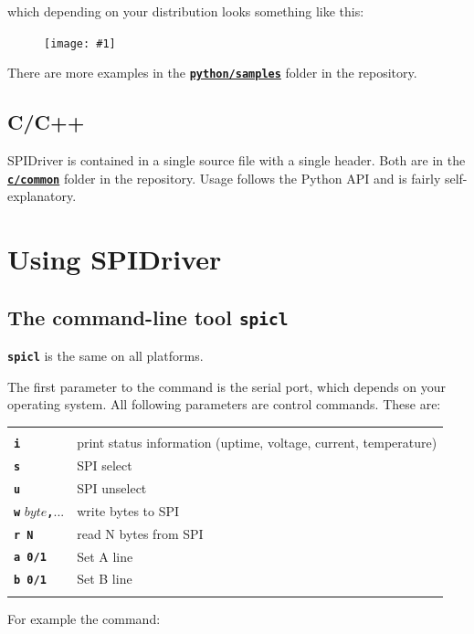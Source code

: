 \documentclass{article}
\newcommand{\png}[1]{
\begin{figure}[H]
\begin{center}
\texttt{[image: \#1]}
\end{center}
\end{figure}
}
\newcommand{\mach}[1]{\texttt{\textbf{#1}}}
\newcommand{\gap}{\vspace{10pt}}
\begin{document}
which depending on your distribution looks something like this:

\png{img/spidriver/spidriver-gui-linux}

There are more examples in the 
\href{https://github.com/jamesbowman/spidriver/tree/master/python/samples}{\mach{python/samples}} folder in the repository.

\subsection{C/C++}

SPIDriver is contained in a single source file with a single header.
Both are in the
\href{https://github.com/jamesbowman/spidriver/tree/master/c/common}{\mach{c/common}} folder in the repository.
Usage follows the Python API and is fairly self-explanatory.

\newpage
\section{Using SPIDriver}

\subsection{The command-line tool \mach{spicl}}
\index{spicl@\mach{spicl}}

\mach{spicl} is the same on all platforms.

The first parameter to the command is the serial port, which depends on your operating system.
All following parameters are control commands. These are:

\gap\begin{tabular}{ll}
\hline \\
  \mach{i}     & print status information (uptime, voltage, current, temperature) \\
  \mach{s}     & SPI select \\
  \mach{u}     & SPI unselect \\
  \mach{w} $byte$\mach{,}...     & write bytes to SPI \\
  \mach{r N}   & read N bytes from SPI \\
  \mach{a 0/1} & Set A line \\
  \mach{b 0/1} & Set B line \\
\hline \\
\end{tabular}
\gap

For example the command:
\end{document}
